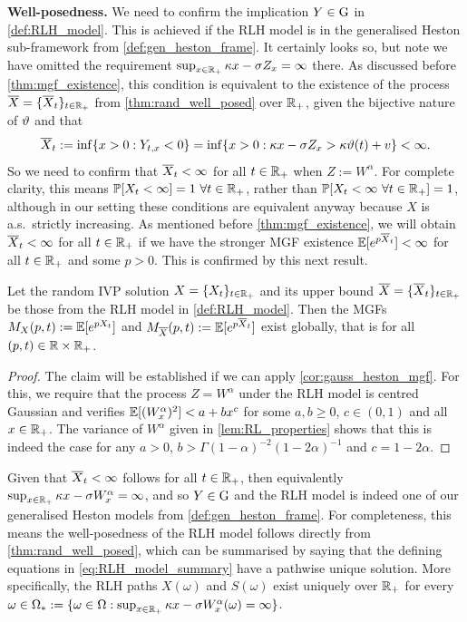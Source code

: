\vspace{3mm}\textbf{Well-posedness.} We need to confirm the implication $Y\in\mathrm{G}$ in \autoref{def:RLH_model}. This is achieved if the RLH model is in the generalised Heston sub-framework from \autoref{def:gen_heston_frame}. It certainly looks so, but note we have omitted the requirement $\sup_{x\in\mathbb{R}_+}\kappa x - \sigma Z_x=\infty$ there. As discussed before \autoref{thm:mgf_existence}, this condition is equivalent to the existence of the process ${\overline{X}}=\{{\overline{X}}_t\}_{t\in\mathbb{R}_+}$ from \autoref{thm:rand_well_posed} over $\mathbb{R}_+$, given the bijective nature of $\vartheta$ and that
\begin{equation}
    {\overline{X}}_t := \inf\{x>0:Y_{t,x}<0\} = \inf\{x>0:\kappa x - \sigma Z_x > \kappa\vartheta(t) + v\} < \infty.
\end{equation}
So we need to confirm that ${\overline{X}}_t<\infty$ for all $t\in\mathbb{R}_+$ when $Z:=W^\alpha$. For complete clarity, this means $\mathbb{P}[X_t<\infty]=1\ \forall t\in\mathbb{R}_+$, rather than $\mathbb{P}[X_t<\infty\ \forall t\in\mathbb{R}_+]=1$, although in our setting these conditions are equivalent anyway because $X$ is a.s.~strictly increasing. As mentioned before \autoref{thm:mgf_existence}, we will obtain ${\overline{X}}_t<\infty$ for all $t\in\mathbb{R}_+$ if we have the stronger MGF existence $\mathbb{E}[e^{p{\overline{X}}_t}]<\infty$ for all $t\in\mathbb{R}_+$ and some $p>0$. This is confirmed by this next result.

\begin{corollary}\label{cor:rlh_mgf_exist}
    Let the random IVP solution $X=\{X_t\}_{t\in\mathbb{R}_+}$ and its upper bound ${\overline{X}}=\{{\overline{X}}_t\}_{t\in\mathbb{R}_+}$ be those from the RLH model in \autoref{def:RLH_model}. Then the MGFs $M_X(p,t):=\mathbb{E}[e^{pX_t}]$ and $M_{\overline{X}}(p,t):=\mathbb{E}[e^{p{\overline{X}}_t}]$ exist globally, that is for all $(p,t)\in\mathbb{R}\times\mathbb{R}_+$.
\end{corollary}
\begin{proof}
    The claim will be established if we can apply \autoref{cor:gauss_heston_mgf}. For this, we require that the process $Z=W^\alpha$ under the RLH model is centred Gaussian and verifies $\mathbb{E}[(W^\alpha_x)^2]<a + bx^c$ for some $a,b\ge0$, $c\in(0,1)$ and all $x\in\mathbb{R}_+$. The variance of $W^\alpha$ given in \autoref{lem:RL_properties} shows that this is indeed the case for any $a>0$, $b>\Gamma(1-\alpha)^{-2}(1-2\alpha)^{-1}$ and $c=1-2\alpha$.
\end{proof}

Given that ${\overline{X}}_t<\infty$ follows for all $t\in\mathbb{R}_+$, then equivalently $\sup_{x\in\mathbb{R}_+}\kappa x - \sigma W^\alpha_x=\infty$, and so $Y\in\mathrm{G}$ and the RLH model is indeed one of our generalised Heston models from \autoref{def:gen_heston_frame}. For completeness, this means the well-posedness of the RLH model follows directly from \autoref{thm:rand_well_posed}, which can be summarised by saying that the defining equations in \autoref{eq:RLH_model_summary} have a pathwise unique solution. More specifically, the RLH paths $X(\omega)$ and $S(\omega)$ exist uniquely over $\mathbb{R}_+$ for every $\omega\in\Omega_*:=\{\omega\in\Omega: \sup_{x\in\mathbb{R}_+}\kappa x -\sigma W^\alpha_x(\omega)=\infty\}$.

